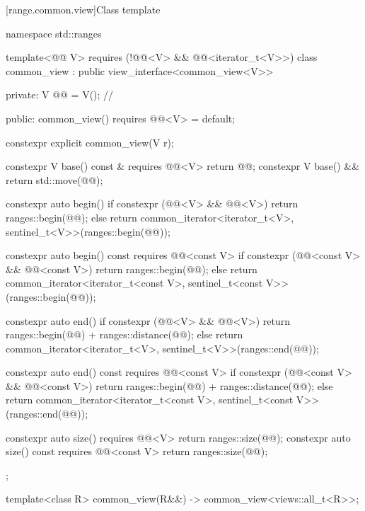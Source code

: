 [range.common.view]{Class template }

%
%
%
%
%
\begin{codeblock}
namespace std::ranges {
  template<@@ V>
    requires (!@@<V> && @@<iterator_t<V>>)
  class common_view : public view_interface<common_view<V>> {
  private:
    V @@ = V();  // \expos

  public:
    common_view() requires @@<V> = default;

    constexpr explicit common_view(V r);

    constexpr V base() const & requires @@<V> { return @@; }
    constexpr V base() && { return std::move(@@); }

    constexpr auto begin() {
      if constexpr (@@<V> && @@<V>)
        return ranges::begin(@@);
      else
        return common_iterator<iterator_t<V>, sentinel_t<V>>(ranges::begin(@@));
    }

    constexpr auto begin() const requires @@<const V> {
      if constexpr (@@<const V> && @@<const V>)
        return ranges::begin(@@);
      else
        return common_iterator<iterator_t<const V>, sentinel_t<const V>>(ranges::begin(@@));
    }

    constexpr auto end() {
      if constexpr (@@<V> && @@<V>)
        return ranges::begin(@@) + ranges::distance(@@);
      else
        return common_iterator<iterator_t<V>, sentinel_t<V>>(ranges::end(@@));
    }

    constexpr auto end() const requires @@<const V> {
      if constexpr (@@<const V> && @@<const V>)
        return ranges::begin(@@) + ranges::distance(@@);
      else
        return common_iterator<iterator_t<const V>, sentinel_t<const V>>(ranges::end(@@));
    }

    constexpr auto size() requires @@<V> {
      return ranges::size(@@);
    }
    constexpr auto size() const requires @@<const V> {
      return ranges::size(@@);
    }
  };

  template<class R>
    common_view(R&&) -> common_view<views::all_t<R>>;
}
\end{codeblock}

